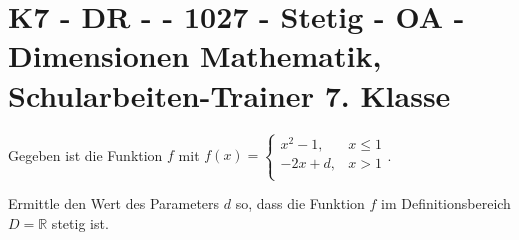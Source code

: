 \section{K7 - DR -  - 1027 - Stetig - OA - Dimensionen Mathematik, Schularbeiten-Trainer 7. Klasse}

\begin{beispiel}[K7 - DR]{1} %
Gegeben ist die Funktion $f$ mit $f(x)=\begin{cases}
x^2-1,&x\leq 1\\
-2x+d,&x>1\\
\end{cases}$.

Ermittle den Wert des Parameters $d$ so, dass die Funktion $f$ im Definitionsbereich $D=\mathbb{R}$ stetig ist.\leer

				
				\end{beispiel}